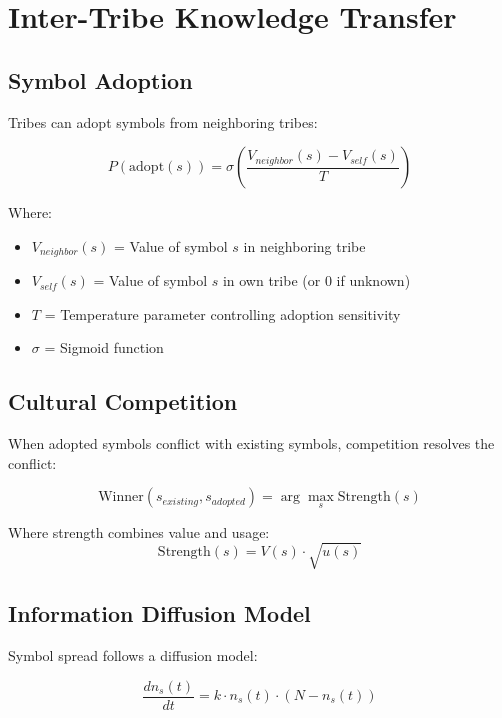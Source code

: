 \documentclass[11pt,a4paper]{article}
\begin{document}
\section{Inter-Tribe Knowledge Transfer}

\subsection{Symbol Adoption}

Tribes can adopt symbols from neighboring tribes:

\begin{equation}
P(\text{adopt}(s)) = \sigma\left( \frac{V_{neighbor}(s) - V_{self}(s)}{T} \right)
\end{equation}

Where:
\begin{itemize}
    \item $V_{neighbor}(s)$ = Value of symbol $s$ in neighboring tribe
    \item $V_{self}(s)$ = Value of symbol $s$ in own tribe (or 0 if unknown)
    \item $T$ = Temperature parameter controlling adoption sensitivity
    \item $\sigma$ = Sigmoid function
\end{itemize}

\subsection{Cultural Competition}

When adopted symbols conflict with existing symbols, competition resolves the conflict:

\begin{equation}
\text{Winner}(s_{existing}, s_{adopted}) = \arg\max_s \text{Strength}(s)
\end{equation}

Where strength combines value and usage:
\begin{equation}
\text{Strength}(s) = V(s) \cdot \sqrt{u(s)}
\end{equation}

\subsection{Information Diffusion Model}

Symbol spread follows a diffusion model:

\begin{equation}
\frac{d n_s(t)}{dt} = k \cdot n_s(t) \cdot (N - n_s(t))
\end{equation}
\end{document}
